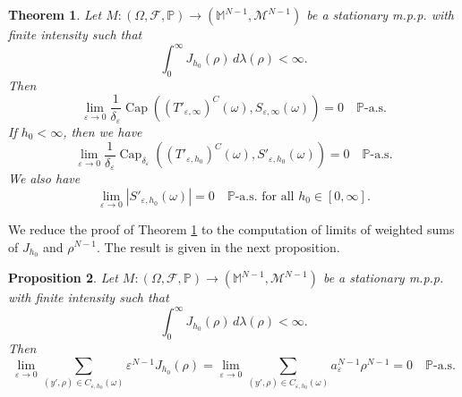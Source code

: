 \documentclass{article}
\numberwithin{equation}{section}
\newtheorem{theorem}{Theorem}[section]
\newtheorem{proposition}[theorem]{Proposition}
\theoremstyle{definition}
\theoremstyle{remark}
\newcommand{\cpct}{\operatorname{Cap}}
\begin{document}
\begin{theorem} \label{thm:vanishing_capacity_and_measure}
    Let $M : (\Omega, \mathcal{F}, \mathbb{P}) \rightarrow (\mathbb{M}^{N - 1}, \mathcal{M}^{N - 1})$ be a stationary m.p.p. with finite intensity such that
    \[
    \int_0^\infty J_{h_0}(\rho) \, d\lambda(\rho) < \infty.
    \]
    Then
    \begin{equation} \label{eq:capacity_vanishes_infinity}
        \lim_{\varepsilon \to 0} \frac{1}{\delta_\varepsilon} \cpct\left((T'_{\varepsilon, \infty})^C(\omega), S_{\varepsilon, \infty}(\omega)\right) = 0 \quad \mathbb{P}\text{-a.s.}
    \end{equation}
    If $h_0 < \infty$, then we have
    \begin{equation} \label{eq:capacity_vanishes_noninfinity}
        \lim_{\varepsilon \to 0} \frac{1}{\delta_\varepsilon} \cpct_{\delta_\varepsilon}\left((T'_{\varepsilon, h_0})^C(\omega), S'_{\varepsilon, h_0}(\omega)\right) = 0 \quad \mathbb{P}\text{-a.s.}
    \end{equation}
    We also have
    \begin{equation} \label{eq:measure_vanishes}
        \lim_{\varepsilon \to 0} |S'_{\varepsilon, h_0}(\omega)| = 0 \quad \mathbb{P}\text{-a.s. for all } h_0 \in [0, \infty].
    \end{equation}
\end{theorem}

We reduce the proof of Theorem \ref{thm:vanishing_capacity_and_measure} to the computation of limits of weighted sums of $J_{h_0}$ and $\rho^{N - 1}$. The result is given in the next proposition.

\begin{proposition} \label{pr:weighted_sums_go_to_zero}
     Let $M : (\Omega, \mathcal{F}, \mathbb{P}) \rightarrow (\mathbb{M}^{N - 1}, \mathcal{M}^{N - 1})$ be a stationary m.p.p. with finite intensity such that
    \[
    \int_0^\infty J_{h_0}(\rho) \, d\lambda(\rho) < \infty.
    \]
    Then
    \begin{equation} \label{eq:weighted_sums_go_to_zero}
        \lim_{\varepsilon \to 0} \sum_{(y', \rho) \in C_{\varepsilon, h_0}(\omega)} \varepsilon^{N - 1} J_{h_0}(\rho) = \lim_{\varepsilon \to 0} \sum_{(y', \rho) \in C_{\varepsilon, h_0}(\omega)} a_\varepsilon^{N - 1} \rho^{N - 1} = 0 \quad \mathbb{P}\text{-a.s.}
    \end{equation}
\end{proposition}
\end{document}
